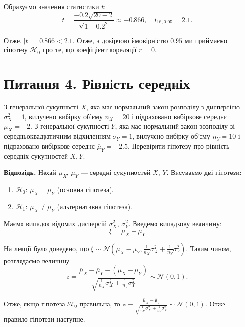 \documentclass{../hw_template}
\begin{document}
Обрахуємо значення статистики $t$:
\begin{equation*}
    t = \frac{-0.2\sqrt{20-2}}{\sqrt{1-0.2^2}} \approx -0.866, \quad t_{18,0.05} = 2.1.
\end{equation*}

Отже, $|t| = 0.866 < 2.1$. Отже, з довірчою ймовірністю $0.95$ ми приймаємо гіпотезу $\mathcal{H}_0$ про те, що коефіцієнт кореляції $r=0$.

\newpage

\section{Питання 4. Рівність середніх}

\begin{problems}
    З генеральної сукупності $X$, яка має нормальний закон розподілу з
дисперсією $\sigma_X^2 = 4$, вилучено вибірку об’єму $n_X=20$ і підраховано
вибіркове середнє $\overline{\mu}_X = -2$. З генеральної сукупності $Y$, яка має
нормальний закон розподілу зі середньоквадратичним відхиленням $\sigma_Y=1$,
вилучено вибірку об’єму $n_Y=10$ і підраховано вибіркове середнє
$\overline{\mu}_Y = -2.5$. Перевірити гіпотезу про рівність середніх сукупностей
$X, Y$.
\end{problems}

\textbf{Відповідь.} Нехай $\mu_X$, $\mu_Y$ --- середні сукупностей $X$, $Y$. Висуваємо дві гіпотези:
\begin{enumerate}
    \item $\mathcal{H}_0$: $\mu_X = \mu_Y$ (основна гіпотеза).
    \item $\mathcal{H}_1$: $\mu_X \neq \mu_Y$ (альтернативна гіпотеза).
\end{enumerate}

Маємо випадок відомих дисперсій $\sigma_X^2$, $\sigma_Y^2$. Введемо випадкову величину:
\begin{equation*}
    \xi = \overline{\mu}_X - \overline{\mu}_Y
\end{equation*}

На лекції було доведено, що $\xi \sim \mathcal{N}\left(\mu_X - \mu_Y, \frac{1}{n_X}\sigma_X^2 + \frac{1}{n_Y}\sigma_Y^2\right)$.
Таким чином, розглядаємо величину
\begin{equation*}
    z = \frac{\overline{\mu}_X - \overline{\mu}_Y - (\mu_X - \mu_Y)}{\sqrt{\frac{1}{n_X}\sigma_X^2 + \frac{1}{n_Y}\sigma_Y^2}} \sim \mathcal{N}(0,1).
\end{equation*} 

Отже, якщо гіпотеза $\mathcal{H}_0$ правильна, то $z=\frac{\overline{\mu}_X - \overline{\mu}_Y}{\sqrt{\frac{1}{n_X}\sigma_X^2 + \frac{1}{n_Y}\sigma_Y^2}} \sim \mathcal{N}(0,1)$. Отже правило гіпотези наступне.
\end{document}

